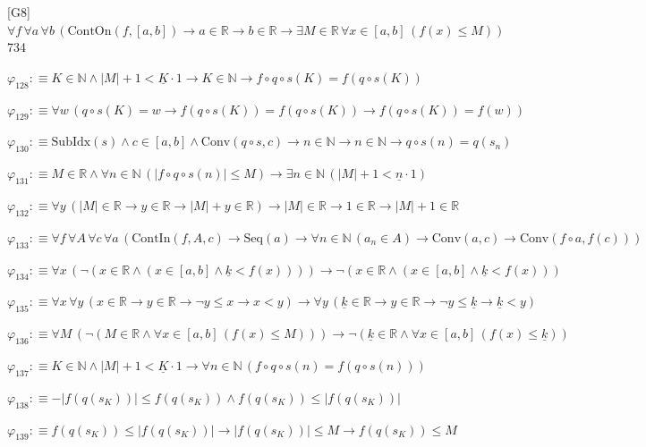\begin{fullproof}{[G8]}{$\forall f\,\forall a\,\forall b\,(\mathrm{ContOn}(f,[a,b]) \to a \in \mathbb{R} \to b \in \mathbb{R} \to \exists M \in \mathbb{R}\,\forall x \in [a,b]\,(f(x) \leq M))$}{734}
\begin{abbrevlist}
\item $\varphi_{128} :\equiv K \in \mathbb{N} \land \lvert M \rvert + 1 < \underline{K} \cdot 1 \to K \in \mathbb{N} \to f \circ q \circ s(K) = f(q \circ s(K))$
\item $\varphi_{129} :\equiv \forall w\,(q \circ s(K) = w \to f(q \circ s(K)) = f(q \circ s(K)) \to f(q \circ s(K)) = f(w))$
\item $\varphi_{130} :\equiv \mathrm{SubIdx}(s) \land c \in [a,b] \land \mathrm{Conv}(q \circ s,c) \to n \in \mathbb{N} \to n \in \mathbb{N} \to q \circ s(n) = q(s_{n})$
\item $\varphi_{131} :\equiv M \in \mathbb{R} \land \forall n \in \mathbb{N}\,(\lvert f \circ q \circ s(n) \rvert \leq M) \to \exists n \in \mathbb{N}\,(\lvert M \rvert + 1 < \underline{n} \cdot 1)$
\item $\varphi_{132} :\equiv \forall y\,(\lvert M \rvert \in \mathbb{R} \to y \in \mathbb{R} \to \lvert M \rvert + y \in \mathbb{R}) \to \lvert M \rvert \in \mathbb{R} \to 1 \in \mathbb{R} \to \lvert M \rvert + 1 \in \mathbb{R}$
\item $\varphi_{133} :\equiv \forall f\,\forall A\,\forall c\,\forall a\,(\mathrm{ContIn}(f,A,c) \to \mathrm{Seq}(a) \to \forall n \in \mathbb{N}\,(a_{n} \in A) \to \mathrm{Conv}(a,c) \to \mathrm{Conv}(f \circ a,f(c)))$
\item $\varphi_{134} :\equiv \forall x\,(\neg (x \in \mathbb{R} \land (x \in [a,b] \land \underline{k} < f(x)))) \to \neg (x \in \mathbb{R} \land (x \in [a,b] \land \underline{k} < f(x)))$
\item $\varphi_{135} :\equiv \forall x\,\forall y\,(x \in \mathbb{R} \to y \in \mathbb{R} \to \neg y \leq x \to x < y) \to \forall y\,(\underline{k} \in \mathbb{R} \to y \in \mathbb{R} \to \neg y \leq \underline{k} \to \underline{k} < y)$
\item $\varphi_{136} :\equiv \forall M\,(\neg (M \in \mathbb{R} \land \forall x \in [a,b]\,(f(x) \leq M))) \to \neg (\underline{k} \in \mathbb{R} \land \forall x \in [a,b]\,(f(x) \leq \underline{k}))$
\item $\varphi_{137} :\equiv K \in \mathbb{N} \land \lvert M \rvert + 1 < \underline{K} \cdot 1 \to \forall n \in \mathbb{N}\,(f \circ q \circ s(n) = f(q \circ s(n)))$
\item $\varphi_{138} :\equiv -\lvert f(q(s_{K})) \rvert \leq f(q(s_{K})) \land f(q(s_{K})) \leq \lvert f(q(s_{K})) \rvert$
\item $\varphi_{139} :\equiv f(q(s_{K})) \leq \lvert f(q(s_{K})) \rvert \to \lvert f(q(s_{K})) \rvert \leq M \to f(q(s_{K})) \leq M$

\end{abbrevlist}
\end{fullproof}
